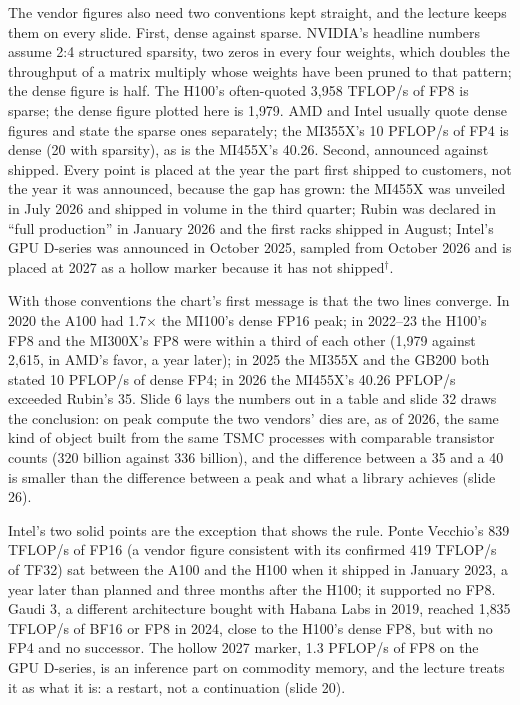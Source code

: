 \documentclass[11pt,letterpaper]{article}
\begin{document}
The vendor figures also need two conventions kept straight, and the lecture keeps them on every slide. First, dense against sparse. NVIDIA's headline numbers assume 2:4 structured sparsity, two zeros in every four weights, which doubles the throughput of a matrix multiply whose weights have been pruned to that pattern; the dense figure is half. The H100's often-quoted 3{,}958 TFLOP/s of FP8 is sparse; the dense figure plotted here is 1{,}979. AMD and Intel usually quote dense figures and state the sparse ones separately; the MI355X's 10 PFLOP/s of FP4 is dense (20 with sparsity), as is the MI455X's 40.26. Second, announced against shipped. Every point is placed at the year the part first shipped to customers, not the year it was announced, because the gap has grown: the MI455X was unveiled in July 2026 and shipped in volume in the third quarter; Rubin was declared in ``full production'' in January 2026 and the first racks shipped in August; Intel's GPU D-series was announced in October 2025, sampled from October 2026 and is placed at 2027 as a hollow marker because it has not shipped$^\dagger$.

With those conventions the chart's first message is that the two lines converge. In 2020 the A100 had 1.7$\times$ the MI100's dense FP16 peak; in 2022--23 the H100's FP8 and the MI300X's FP8 were within a third of each other (1{,}979 against 2{,}615, in AMD's favor, a year later); in 2025 the MI355X and the GB200 both stated 10 PFLOP/s of dense FP4; in 2026 the MI455X's 40.26 PFLOP/s exceeded Rubin's 35. Slide 6 lays the numbers out in a table and slide 32 draws the conclusion: on peak compute the two vendors' dies are, as of 2026, the same kind of object built from the same TSMC processes with comparable transistor counts (320 billion against 336 billion), and the difference between a 35 and a 40 is smaller than the difference between a peak and what a library achieves (slide 26).

Intel's two solid points are the exception that shows the rule. Ponte Vecchio's 839 TFLOP/s of FP16 (a vendor figure consistent with its confirmed 419 TFLOP/s of TF32) sat between the A100 and the H100 when it shipped in January 2023, a year later than planned and three months after the H100; it supported no FP8. Gaudi 3, a different architecture bought with Habana Labs in 2019, reached 1{,}835 TFLOP/s of BF16 or FP8 in 2024, close to the H100's dense FP8, but with no FP4 and no successor. The hollow 2027 marker, 1.3 PFLOP/s of FP8 on the GPU D-series, is an inference part on commodity memory, and the lecture treats it as what it is: a restart, not a continuation (slide 20).
\end{document}
